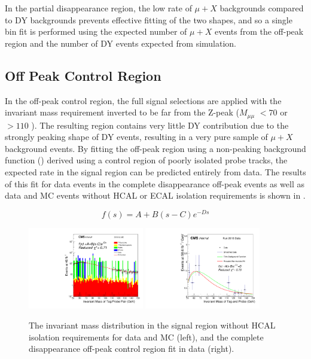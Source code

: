 In the partial disappearance region, the low rate of $\mu+X$ backgrounds compared to DY backgrounds prevents effective fitting of the two shapes, and so a single bin fit is performed using the expected number of $\mu+X$ events from the off-peak region and the number of DY events expected from simulation.

\subsection{Off Peak Control Region}
In the off-peak control region, the full signal selections are applied with the invariant mass requirement inverted to be far from the Z-peak ($M_{\mu\mu}$ $<70$ or $>110$ \GeV). 
The resulting region contains very little DY contribution due to the strongly peaking shape of DY events, resulting in a very pure sample of $\mu+X$ background events. 
By fitting the off-peak region using a non-peaking background function () derived using a control region of poorly isolated probe tracks, the expected rate in the signal region can be predicted entirely from data. 
The results of this fit for data events in the complete disappearance off-peak events as well as data and MC events without HCAL or ECAL isolation requirements is shown in .

\begin{equation} 
    \label{eq:bkgfunc}
    f(s)=A+B(s-C)e^{-Ds} 
\end{equation}

\begin{figure}[htp]
    \centering
    \includegraphics[width=0.45\textwidth]{figures/offPeakCr_noIso.pdf}
    \hspace{0.01\textwidth}
    \includegraphics[width=0.45\textwidth]{figures/offPeakCr_fit.pdf} 
     \caption[$\mu$+X background fits in the off-peak control region for complete disappearance events]{The invariant mass distribution in the signal region without HCAL isolation requirements for data and MC (left), and the complete disappearance off-peak control region fit in data (right).}
    \label{fig:offpeakfit}
 \end{figure}
 
